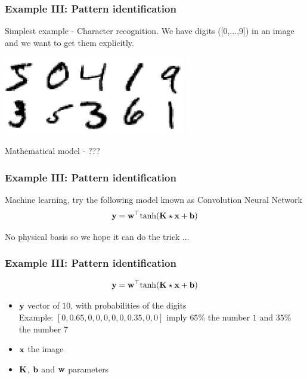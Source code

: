 \documentclass[12pt,fleqn]{beamer}
\begin{document}
\begin{frame}
\frametitle{Example III: Pattern identification}

Simplest example - Character recognition.
We have digits ([0,...,9]) in an image and we want to get them explicitly.

\begin{center}
\includegraphics[width=8cm]{digits.jpg}
\end{center}

\vspace{1cm}

Mathematical model - ???

\end{frame}

\begin{frame}
\frametitle{Example III: Pattern identification}



Machine learning, try the following model known as Convolution Neural Network 
$$ {\bf y} = {\bf w}^{\top} {\rm tanh}( \bf K \star {\bf x} + {\bf b} ) $$

\vspace{1cm}

No physical basis so we hope it can do the trick ...


\end{frame}

\begin{frame}
\frametitle{Example III: Pattern identification}

$$ {\bf y} = {\bf w}^{\top} {\rm tanh}( \bf K \star {\bf x} + {\bf b} ) $$

\begin{itemize}
\item $\bf y$ vector of $10$, with probabilities of the digits\\
Example: $ [0,0.65,0,0,0,0,0,0.35,0,0] $ imply $65\%$ the number $1$ and
$35\%$ the number $7$
\item $\bf x$ the image
\item $\bf K$, $\bf b$ and $\bf w$ parameters
\end{itemize}

\end{frame}
\end{document}
